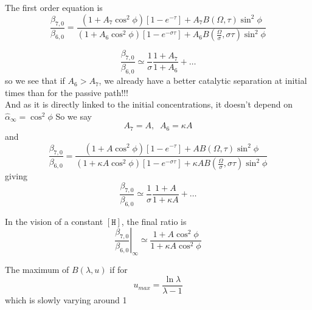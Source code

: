 \documentclass[aps,onecolumn,12pt]{revtex4}
\newcommand{\mychem}[1]{\mathtt{#1}}
\newcommand{\myconc}[1]{\left\lbrack{#1}\right\rbrack}
\newcommand{\spproton}{\mychem{H}}
\newcommand{\proton}{\myconc{\spproton}}
\begin{document}
The first order equation is
\begin{equation}
	\dfrac{\beta_{7,0}}{\beta_{6,0}} = 
	\dfrac
	{\left( 1 + A_7\cos^2\phi \right)  \left[1-e^{-\tau}\right]+ A_7B(\Omega,\tau) \sin^2\phi }
	{\left( 1 + A_6\cos^2\phi \right)  \left[1-e^{-\sigma\tau}\right]+ A_6B(\frac{\Omega}{\sigma},\sigma\tau) \sin^2\phi }
\end{equation}

\begin{equation}
\dfrac{\beta_{7,0}}{\beta_{6,0}} \simeq \dfrac{1}{\sigma}\dfrac{1+A_7}{1+A_6} + \ldots
\end{equation}
so we see that if $A_6>A_7$, we already have a better catalytic separation at initial times than for the passive path!!!\\
And as it is directly linked to the initial concentrations, it doesn't depend on $\hat\alpha_\infty=\cos^2\phi$
So we say
\begin{equation}
	A_7 = A,\;\; A_6 = \kappa A
\end{equation}
and
\begin{equation}
	\dfrac{\beta_{7,0}}{\beta_{6,0}} = 
	\dfrac
	{\left( 1 + A\cos^2\phi \right)  \left[1-e^{-\tau}\right]+ A B(\Omega,\tau) \sin^2\phi }
	{\left( 1 + \kappa A\cos^2\phi \right)  \left[1-e^{-\sigma\tau}\right]+ \kappa A B(\frac{\Omega}{\sigma},\sigma\tau) \sin^2\phi }
\end{equation}
giving
\begin{equation}
\dfrac{\beta_{7,0}}{\beta_{6,0}} \simeq \dfrac{1}{\sigma}\dfrac{1+A}{1+\kappa A} + \ldots
\end{equation}

In the vision of a constant $\proton$, the final ratio is
\begin{equation}
	\left.\dfrac{\beta_{7,0}}{\beta_{6,0}}\right|_\infty \simeq \dfrac{1+A\cos^2\phi}{1+\kappa A\cos^2\phi}
\end{equation}


The maximum of $B(\lambda,u)$ if for
$$
	u_{max} = \dfrac{\ln \lambda}{\lambda-1}
$$
which is slowly varying around 1
\end{document}
